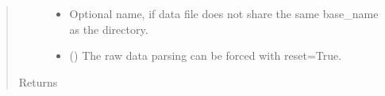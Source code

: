 \documentclass[letterpaper,10pt,english]{sphinxmanual}
\begin{document}
\begin{fulllineitems}
\begin{fulllineitems}
\begin{quote}
\begin{description}
\begin{itemize}
\item {} 
\sphinxAtStartPar
{} \textendash{} Optional name, if data file does not share the same base\_name as the directory.

\item {} 
\sphinxAtStartPar
{} () \textendash{} The raw data parsing can be forced with reset=True.

\end{itemize}

\item[{Returns}] \leavevmode
\sphinxAtStartPar


\end{description}\end{quote}

\end{fulllineitems}


\end{fulllineitems}

\end{document}
